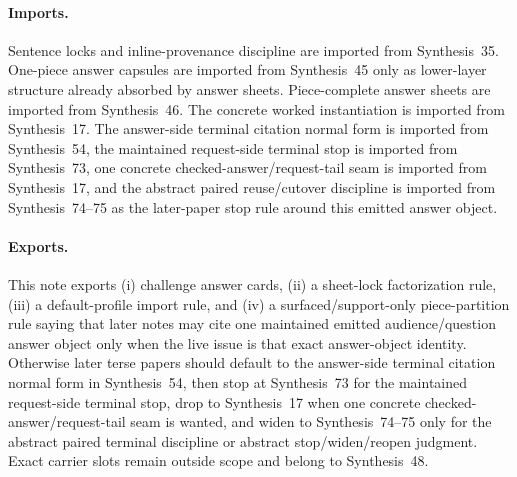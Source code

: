 \documentclass[11pt]{article}
\begin{document}
\paragraph{Imports.}
Sentence locks and inline-provenance discipline are imported from Synthesis~35.\cite{series:sentencelocks}
One-piece answer capsules are imported from Synthesis~45 only as lower-layer structure already absorbed by answer sheets.\cite{series:challengeanswercapsules}
Piece-complete answer sheets are imported from Synthesis~46.\cite{series:challengeanswersheets}
The concrete worked instantiation is imported from Synthesis~17.\cite{series:workedexample}
The answer-side terminal citation normal form is imported from Synthesis~54, the maintained request-side terminal stop is imported from Synthesis~73, one concrete checked-answer/request-tail seam is imported from Synthesis~17, and the abstract paired reuse/cutover discipline is imported from Synthesis~74--75 as the later-paper stop rule around this emitted answer object.\cite{series:challengeanswerreviewmenus,series:publicrequestresponsepacketrefreshresponsepacketclosureverdicts,series:workedexample,series:pairedterminalcitationdiscipline,series:pairedterminalcutoverrules}

\paragraph{Exports.}
This note exports (i) challenge answer cards, (ii) a sheet-lock factorization rule, (iii) a default-profile import rule, and (iv) a surfaced/support-only piece-partition rule saying that later notes may cite one maintained emitted audience/question answer object only when the live issue is that exact answer-object identity.
Otherwise later terse papers should default to the answer-side terminal citation normal form in Synthesis~54, then stop at Synthesis~73 for the maintained request-side terminal stop, drop to Synthesis~17 when one concrete checked-answer/request-tail seam is wanted, and widen to Synthesis~74--75 only for the abstract paired terminal discipline or abstract stop/widen/reopen judgment. Exact carrier slots remain outside scope and belong to Synthesis~48.\cite{series:challengeanswerreviewmenus,series:publicrequestresponsepacketrefreshresponsepacketclosureverdicts,series:workedexample,series:pairedterminalcitationdiscipline,series:pairedterminalcutoverrules}
\end{document}
